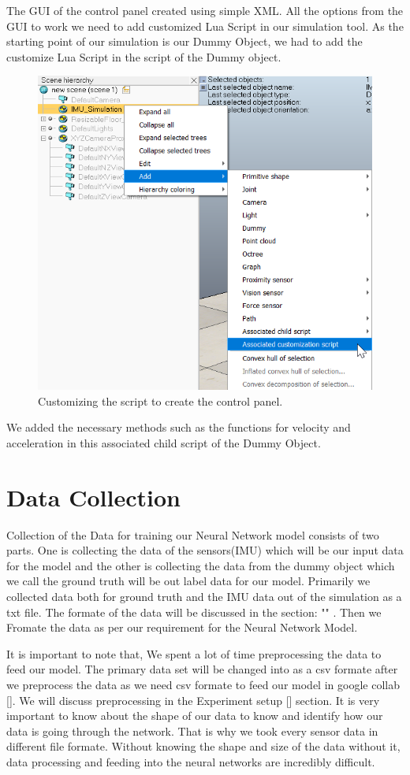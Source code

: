 The GUI of the control panel created using simple XML. All the options from the GUI to work we need to add customized Lua Script in our simulation tool. As the starting point of our simulation is our Dummy Object, we had to add the customize Lua Script in the script of the Dummy object.

\begin{figure}[h]
  \centering
    \includegraphics[width=0.6\linewidth]{figures/assoChildScript.png}
    \caption{Customizing the script to create the control panel.}
\label{fig:assoCS}
\end{figure}

We added the necessary methods such as the functions for velocity and acceleration in this associated child script of the Dummy Object.


\section{Data Collection} \label{dataCollection}
Collection of the Data for training our Neural Network model consists of two parts. One is collecting the data of the sensors(IMU) which will be our input data for the model and the other is collecting the data from the dummy object which we call the ground truth will be out label data for our model.
Primarily we collected data both for ground truth and the IMU data out of the simulation as a txt file. The formate of the data will be discussed in the section: "" . Then we Fromate the data as per our requirement for the Neural Network Model.

It is important to note that, We spent a lot of time preprocessing the data to feed our model. The primary data set will be changed into as a csv formate after we preprocess the data as we need csv formate to feed our model in google collab []. We will discuss preprocessing in the Experiment setup [] section. It is very important to know about the shape of our data to know and identify how our data is going through the network. That is why we took every sensor data in different file formate. Without knowing the shape and size of the data without it, data processing and feeding into the neural networks are incredibly difficult.

